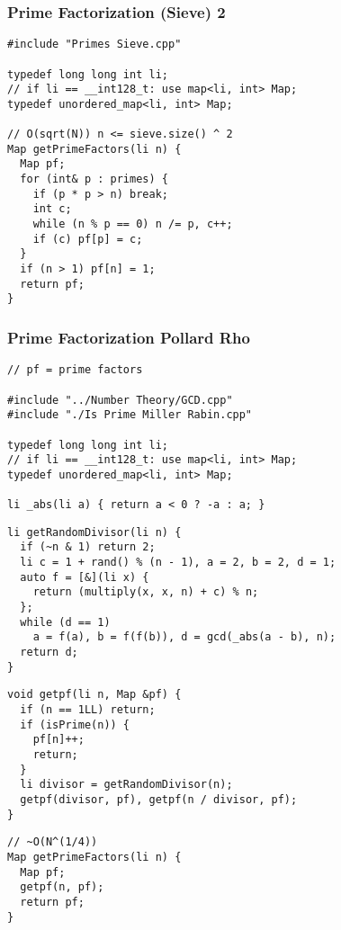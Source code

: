 \documentclass[twoside]{article}
\begin{document}
\begin{multicols*}{2}
\subsubsectionfont{\large\bfseries\sffamily\underline}
\subsubsection*{Prime Factorization (Sieve) 2}
\begin{verbatim}
#include "Primes Sieve.cpp"

typedef long long int li;
// if li == __int128_t: use map<li, int> Map;
typedef unordered_map<li, int> Map;

// O(sqrt(N)) n <= sieve.size() ^ 2
Map getPrimeFactors(li n) {
  Map pf;
  for (int& p : primes) {
    if (p * p > n) break;
    int c;
    while (n % p == 0) n /= p, c++;
    if (c) pf[p] = c;
  }
  if (n > 1) pf[n] = 1;
  return pf;
}
\end{verbatim}

\subsubsectionfont{\large\bfseries\sffamily\underline}
\subsubsection*{Prime Factorization Pollard Rho}
\begin{verbatim}
// pf = prime factors

#include "../Number Theory/GCD.cpp"
#include "./Is Prime Miller Rabin.cpp"

typedef long long int li;
// if li == __int128_t: use map<li, int> Map;
typedef unordered_map<li, int> Map;

li _abs(li a) { return a < 0 ? -a : a; }
\end{verbatim}
\vspace{-12pt}
\begin{verbatim}
li getRandomDivisor(li n) {
  if (~n & 1) return 2;
  li c = 1 + rand() % (n - 1), a = 2, b = 2, d = 1;
  auto f = [&](li x) {
    return (multiply(x, x, n) + c) % n;
  };
  while (d == 1)
    a = f(a), b = f(f(b)), d = gcd(_abs(a - b), n);
  return d;
}
\end{verbatim}
\vspace{-12pt}
\begin{verbatim}
void getpf(li n, Map &pf) {
  if (n == 1LL) return;
  if (isPrime(n)) {
    pf[n]++;
    return;
  }
  li divisor = getRandomDivisor(n);
  getpf(divisor, pf), getpf(n / divisor, pf);
}
\end{verbatim}
\vspace{-12pt}
\begin{verbatim}
// ~O(N^(1/4))
Map getPrimeFactors(li n) {
  Map pf;
  getpf(n, pf);
  return pf;
}
\end{verbatim}


\end{multicols*}
\end{document}
